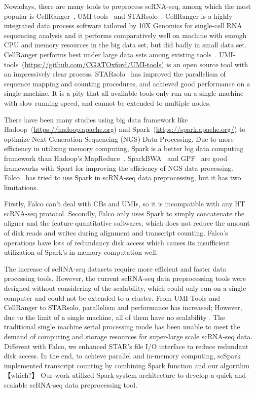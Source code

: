 \documentclass[conference]{IEEEtran}
\begin{document}
Nowadays, there are many tools to preprocess scRNA-seq, among which the most popular is CellRanger~\cite{Zheng2017Massively}, UMI-tools~\cite{Smith2017UMItools} and STARsolo~\cite{Blibaum2019STARsolo}. 
CellRanger is a highly integrated data process software tailored by 10X Genomics for single-cell RNA sequencing analysis and it performs comparatively well on machine with enough CPU and memory resources in the big data set, but did badly in small data set. CellRanger performs best under large data sets among existing tools~\cite{Gao2020Comparison}.
UMI-tools~(\url{https://github.com/CGATOxford/UMI-tools}) is an open source tool with an impressively clear process.
STARsolo~\cite{Blibaum2019STARsolo} has improved the parallelism of sequence mapping and counting procedures, and achieved good performance on a single machine.
It is a pity that all avaliable tools only run on a single machine with slow running speed, and cannot be extended to multiple nodes.

There have been many studies using big data framework like Hadoop~(\url{https://hadoop.apache.org}) and Spark~(\url{https://spark.apache.org/}) to optimize Next Generation Sequencing (NGS) Data Processing. 
Due to more efficiency in utilizing memory computing, Spark is a better big data computing framework than Hadoop's MapReduce~\cite{Dean2008MapReduce, Zaharia2012Resilient}. 
SparkBWA~\cite{Abun2016SparkBWA} and GPF~\cite{Li2018Highperformance} are good frameworks with Spart for improving the efficiency of NGS data processing. 
Falco~\cite{Yang2017Falco} has tried to use Spark in scRNA-seq data preprocessing, but it has two limitations. 

Firstly, Falco can't deal with CBs and UMIs, so it is incompatible with any HT scRNA-seq protocol.
Secondly, Falco only uses Spark to simply concatenate the aligner and the feature quantitative softwares, which does not reduce the amount of disk reads and writes during alignment and transcript counting.
Falco’s operations have lots of redundancy disk access which causes its insufficient utilization of Spark’s in-memory computation well. 

The increase of scRNA-seq datasets require more efficient and faster data processing tools. However, the current scRNA-seq data preprocessing tools were designed without considering of the scalability, which could only run on a single computer and could not be extended to a cluster. From UMI-Tools and CellRanger to STARsolo, parallelism and performance has increased; However, due to the limit of a single machine, all of them have no scalability . 
The traditional single machine serial processing mode has been unable to meet the demand of computing and storage resources for super-large scale scRNA-seq data.
Different with Falco, we enhanced STAR's file I/O interface to reduce redundant disk access.
In the end, to achieve parallel and in-memory computing, scSpark implemented transcript counting by combining Spark function and our algorithm【which?】
Our work utilized Spark system architecture to develop a quick and scalable scRNA-seq data preprocessing tool. 
\end{document}
